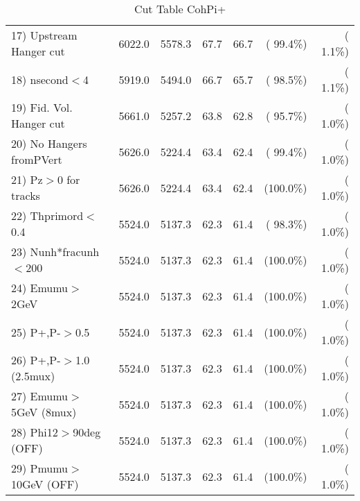 \begin{table}[h!]
\begin{tabular}{||l||r|r|r|r|r|r||}
 17) Upstream Hanger cut  &       6022.0 &       5578.3 &         67.7 &         66.7 & ( 99.4\%) & (  1.1\%) \\
 18) nsecond$<$4          &       5919.0 &       5494.0 &         66.7 &         65.7 & ( 98.5\%) & (  1.1\%) \\
 19) Fid. Vol. Hanger cut &       5661.0 &       5257.2 &         63.8 &         62.8 & ( 95.7\%) & (  1.0\%) \\
 20) No Hangers fromPVert &       5626.0 &       5224.4 &         63.4 &         62.4 & ( 99.4\%) & (  1.0\%) \\
 21) Pz$>$0 for tracks    &       5626.0 &       5224.4 &         63.4 &         62.4 & (100.0\%) & (  1.0\%) \\
 22) Thprimord$<$0.4      &       5524.0 &       5137.3 &         62.3 &         61.4 & ( 98.3\%) & (  1.0\%) \\
 23) Nunh*fracunh$<$200   &       5524.0 &       5137.3 &         62.3 &         61.4 & (100.0\%) & (  1.0\%) \\
 24) Emumu$>$2GeV         &       5524.0 &       5137.3 &         62.3 &         61.4 & (100.0\%) & (  1.0\%) \\
 25) P+,P-$>$0.5          &       5524.0 &       5137.3 &         62.3 &         61.4 & (100.0\%) & (  1.0\%) \\
 26) P+,P-$>$1.0 (2.5mux) &       5524.0 &       5137.3 &         62.3 &         61.4 & (100.0\%) & (  1.0\%) \\
 27) Emumu$>$5GeV  (8mux) &       5524.0 &       5137.3 &         62.3 &         61.4 & (100.0\%) & (  1.0\%) \\
 28) Phi12$>$90deg  (OFF) &       5524.0 &       5137.3 &         62.3 &         61.4 & (100.0\%) & (  1.0\%) \\
 29) Pmumu$>$10GeV  (OFF) &       5524.0 &       5137.3 &         62.3 &         61.4 & (100.0\%) & (  1.0\%) \\
 \hline
 \hline
 \end{tabular}
 \caption{Cut Table  CohPi+   }
 \label{tab-cutcohjpsi-mumu_cohpip}
 \end{table}
